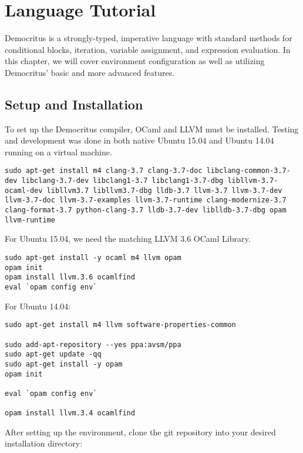 \chapter{Language Tutorial}

Democritus is a strongly-typed, imperative language with standard methods for conditional blocks, iteration, variable assignment, and expression evaluation. In this chapter, we will cover environment configuration as well as utilizing Democritus' basic and more advanced features.

\section{Setup and Installation}

	To set up the Democritus compiler, OCaml and LLVM must be installed. Testing and development was done in both native Ubuntu 15.04 and Ubuntu 14.04 running on a virtual machine.

	\begin{lstlisting}
sudo apt-get install m4 clang-3.7 clang-3.7-doc libclang-common-3.7-dev libclang-3.7-dev libclang1-3.7 libclang1-3.7-dbg libllvm-3.7-ocaml-dev libllvm3.7 libllvm3.7-dbg lldb-3.7 llvm-3.7 llvm-3.7-dev llvm-3.7-doc llvm-3.7-examples llvm-3.7-runtime clang-modernize-3.7 clang-format-3.7 python-clang-3.7 lldb-3.7-dev liblldb-3.7-dbg opam llvm-runtime
	\end{lstlisting}

	\medskip \noindent For Ubuntu 15.04, we need the matching LLVM 3.6 OCaml Library.

	\begin{lstlisting}
sudo apt-get install -y ocaml m4 llvm opam
opam init
opam install llvm.3.6 ocamlfind
eval `opam config env`
\end{lstlisting}

	\medskip \noindent For Ubuntu 14.04:

	\begin{lstlisting}
sudo apt-get install m4 llvm software-properties-common

sudo add-apt-repository --yes ppa:avsm/ppa
sudo apt-get update -qq
sudo apt-get install -y opam
opam init

eval `opam config env`

opam install llvm.3.4 ocamlfind
	\end{lstlisting}

	\medskip \noindent After setting up the environment, clone the git repository into your desired installation directory:

